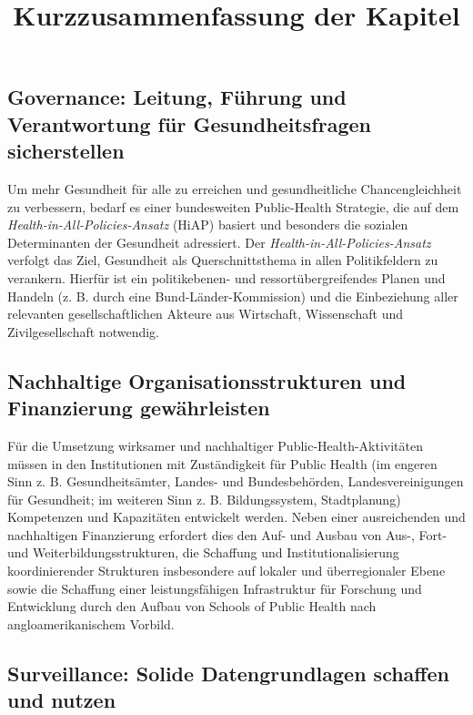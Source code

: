 \documentclass{article}
\begin{document}
\title{Kurzzusammenfassung der Kapitel}

\maketitle


\subsection{Governance: Leitung, Führung und Verantwortung für Gesundheitsfragen sicherstellen}\label{H8407018}



Um mehr Gesundheit für alle zu erreichen und gesundheitliche Chancengleichheit zu verbessern, bedarf es einer bundesweiten Public-Health Strategie, die auf dem \emph{Health-in-All-Policies-Ansatz} (HiAP) basiert und besonders die sozialen Determinanten der Gesundheit adressiert. Der \emph{Health-in-All-Policies-Ansatz} verfolgt das Ziel, Gesundheit als Querschnittsthema in allen Politikfeldern zu verankern. Hierfür ist ein politikebenen- und ressortübergreifendes Planen und Handeln (z. B. durch eine Bund-Länder-Kommission) und die Einbeziehung aller relevanten gesellschaftlichen Akteure aus Wirtschaft, Wissenschaft und Zivilgesellschaft notwendig.


\subsection{Nachhaltige Organisationsstrukturen und Finanzierung gewährleisten}\label{H1207336}



Für die Umsetzung wirksamer und nachhaltiger Public-Health-Aktivitäten müssen in den Institutionen mit Zuständigkeit für Public Health (im engeren Sinn z. B. Gesundheitsämter, Landes- und Bundesbehörden, Landesvereinigungen für Gesundheit; im weiteren Sinn z. B. Bildungssystem, Stadtplanung) Kompetenzen und Kapazitäten entwickelt werden. Neben einer ausreichenden und nachhaltigen Finanzierung erfordert dies den Auf- und Ausbau von Aus-, Fort- und Weiterbildungsstrukturen, die Schaffung und Institutionalisierung koordinierender Strukturen insbesondere auf lokaler und überregionaler Ebene sowie die Schaffung einer leistungsfähigen Infrastruktur für Forschung und Entwicklung durch den Aufbau von Schools of Public Health nach angloamerikanischem Vorbild.


\subsection{Surveillance: Solide Datengrundlagen schaffen und nutzen}\label{H3926614}
\end{document}
